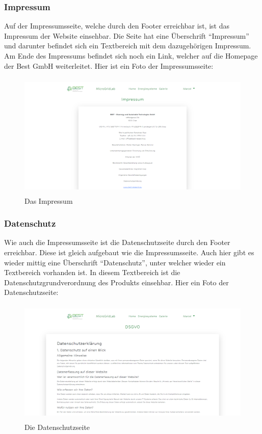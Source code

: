 \subsubsection{Impressum}
Auf der Impressumsseite, welche durch den Footer erreichbar ist, ist das Impressum der Website einsehbar. Die Seite hat eine Überschrift  “Impressum” und darunter befindet sich ein Textbereich  mit dem dazugehörigen Impressum. Am Ende des Impressums befindet sich noch ein Link, welcher auf die Homepage der Best GmbH weiterleitet. Hier ist ein Foto der Impressumsseite:

\begin{figure}[h]
	\centering
	\includegraphics[height=6cm,width=14cm]{images/ImpressumSeite}
	\caption{Das Impressum}
	\label{fig:Impressum}
\end{figure}

\subsubsection{Datenschutz}
Wie auch die Impressumsseite ist die Datenschutzseite durch den Footer erreichbar. Diese ist gleich aufgebaut wie die Impressumsseite. Auch hier gibt es wieder mittig eine Überschrift “Datenschutz”, unter welcher wieder ein Textbereich vorhanden ist. In diesem Textbereich  ist die Datenschutzgrundverordnung des Produkts einsehbar.  Hier ein Foto der Datenschutzseite:
\begin{figure}[h]
	\centering
	\includegraphics[height=6cm,width=14cm]{images/DSGVOSeite}
	\caption{Die Datenschutzseite}
	\label{fig:DSGVO}
\end{figure}
